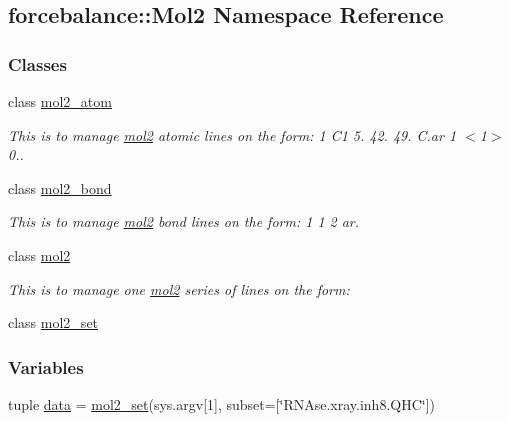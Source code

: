\hypertarget{namespaceforcebalance_1_1Mol2}{\subsection{forcebalance\-:\-:\-Mol2 \-Namespace \-Reference}
\label{namespaceforcebalance_1_1Mol2}
}
\subsubsection*{\-Classes}
\begin{DoxyCompactItemize}
\item 
class \hyperlink{classforcebalance_1_1Mol2_1_1mol2__atom}{mol2\-\_\-atom}
\begin{DoxyCompactList}\small\item\em \-This is to manage \hyperlink{classforcebalance_1_1Mol2_1_1mol2}{mol2} atomic lines on the form\-: 1 \-C1 5. 42. 49. \-C.\-ar 1 $<$1$>$ 0.. \end{DoxyCompactList}\item 
class \hyperlink{classforcebalance_1_1Mol2_1_1mol2__bond}{mol2\-\_\-bond}
\begin{DoxyCompactList}\small\item\em \-This is to manage \hyperlink{classforcebalance_1_1Mol2_1_1mol2}{mol2} bond lines on the form\-: 1 1 2 ar. \end{DoxyCompactList}\item 
class \hyperlink{classforcebalance_1_1Mol2_1_1mol2}{mol2}
\begin{DoxyCompactList}\small\item\em \-This is to manage one \hyperlink{classforcebalance_1_1Mol2_1_1mol2}{mol2} series of lines on the form\-: \end{DoxyCompactList}\item 
class \hyperlink{classforcebalance_1_1Mol2_1_1mol2__set}{mol2\-\_\-set}
\end{DoxyCompactItemize}
\subsubsection*{\-Variables}
\begin{DoxyCompactItemize}
\item 
tuple \hyperlink{namespaceforcebalance_1_1Mol2_a41537283c77bf1c8e05a63667003ae1c}{data} = \hyperlink{classforcebalance_1_1Mol2_1_1mol2__set}{mol2\-\_\-set}(sys.\-argv\mbox{[}1\mbox{]}, subset=\mbox{[}\char`\"{}\-R\-N\-Ase.\-xray.\-inh8.\-Q\-H\-C\char`\"{}\mbox{]})
\end{DoxyCompactItemize}


